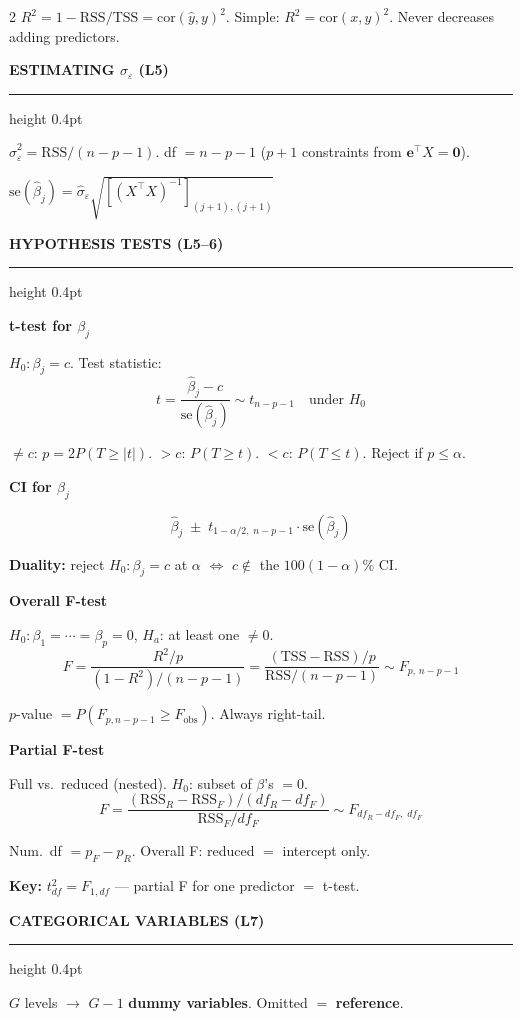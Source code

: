 \documentclass[7pt]{extarticle}
\newcommand{\msection}[1]{%
  \vspace{4pt}%
  {\small\bfseries\color{blue!70!black}\MakeUppercase{#1}}%
  \vspace{1pt}%
  \par\nobreak%
  {\color{blue!70!black}\hrule height 0.4pt}%
  \vspace{2pt}\par\nobreak%
}
\newcommand{\msubsection}[1]{%
  \vspace{2pt}%
  {\footnotesize\bfseries\color{purple!70!black}#1}%
  \vspace{1pt}\par\nobreak%
}
\newcommand{\sighat}{\hat{\sigma}_\varepsilon}
\newcommand{\XtX}{X^\top X}
\newcommand{\ep}{\varepsilon}
\begin{document}
\begin{multicols}{2}
$R^2 = 1 - \text{RSS}/\text{TSS} = \text{cor}(\hat{y},y)^2$. Simple: $R^2 = \text{cor}(x,y)^2$. Never decreases adding predictors.

\msection{Estimating $\sigma_\ep$ (L5)}

$\sighat^2 = \text{RSS}/(n{-}p{-}1)$. \; df $= n{-}p{-}1$ ($p{+}1$ constraints from $\bm{e}^\top X = \bm{0}$).

$\text{se}(\hat\beta_j) = \sighat\sqrt{[(\XtX)^{-1}]_{(j+1),(j+1)}}$

\msection{Hypothesis Tests (L5--6)}

\msubsection{t-test for $\beta_j$}
$H_0:\beta_j = c$. \quad Test statistic:
\[
t = \frac{\hat\beta_j - c}{\text{se}(\hat\beta_j)} \sim t_{n-p-1} \quad \text{under } H_0
\]

$\ne c$: $p{=}2P(T{\ge}|t|)$. \; $>c$: $P(T{\ge}t)$. \; $<c$: $P(T{\le}t)$. Reject if $p \le \alpha$.

\msubsection{CI for $\beta_j$}
\[
\hat\beta_j \;\pm\; t_{1-\alpha/2,\;n-p-1} \cdot \text{se}(\hat\beta_j)
\]

\textbf{Duality:} reject $H_0\!: \beta_j{=}c$ at $\alpha$ $\iff$ $c \notin$ the $100(1{-}\alpha)\%$ CI.

\msubsection{Overall F-test}
$H_0: \beta_1{=}\cdots{=}\beta_p{=}0$, \; $H_a$: at least one $\ne 0$.
\[
F = \frac{R^2/p}{(1{-}R^2)/(n{-}p{-}1)} = \frac{(\text{TSS}{-}\text{RSS})/p}{\text{RSS}/(n{-}p{-}1)} \sim F_{p,\,n-p-1}
\]

$p$-value $= P(F_{p,n-p-1} \ge F_{\text{obs}})$. Always right-tail.

\msubsection{Partial F-test}
Full vs.\ reduced (nested). $H_0$: subset of $\beta$'s $= 0$.
\[
F = \frac{(\text{RSS}_R - \text{RSS}_F)/(df_R - df_F)}{\text{RSS}_F/df_F} \sim F_{df_R-df_F,\;df_F}
\]

Num.\ df $= p_F - p_R$. Overall F: reduced $=$ intercept only.

\textbf{Key:} $t^2_{df} = F_{1,df}$ --- partial F for one predictor $=$ t-test.

\msection{Categorical Variables (L7)}

$G$ levels $\to$ $G{-}1$ \textbf{dummy variables}. Omitted $=$ \textbf{reference}.


\end{multicols}
\end{document}
